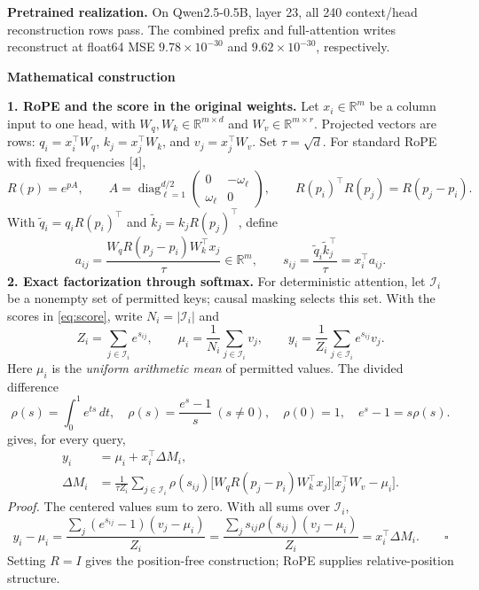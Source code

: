 \documentclass[10pt,a4paper]{article}
\newcommand{\R}{\mathbb R}
\newcommand{\T}{^{\!\top}}
\newcommand{\calI}{\mathcal I}
\newcommand{\ddM}{\Delta M}
\begin{document}
\textbf{Pretrained realization.}
On Qwen2.5-0.5B, layer 23, all 240 context/head reconstruction rows pass.
The combined prefix and full-attention writes reconstruct at float64 MSE
$9.78\times10^{-30}$ and $9.62\times10^{-30}$, respectively.

\medskip

\fontsize{10}{15.8}\selectfont
\setlength{\parskip}{10pt}
\textbf{Mathematical construction}

\textbf{1. RoPE and the score in the original weights.}
Let $x_i\in\R^m$ be a column input to one head, with
$W_q,W_k\in\R^{m\times d}$ and $W_v\in\R^{m\times r}$.
Projected vectors are rows: $q_i=x_i\T W_q$, $k_j=x_j\T W_k$,
and $v_j=x_j\T W_v$. Set $\tau=\sqrt d$.
For standard RoPE with fixed frequencies [4],
\begin{equation}
R(p)=e^{pA},\qquad
A=\operatorname{diag}_{\ell=1}^{d/2}
\begin{pmatrix}0&-\omega_\ell\\\omega_\ell&0\end{pmatrix},
\qquad R(p_i)\T R(p_j)=R(p_j-p_i).
\label{eq:rope}
\end{equation}
With
$\widetilde q_i=q_iR(p_i)\T$ and $\widetilde k_j=k_jR(p_j)\T$, define
\begin{equation}
a_{ij}=\frac{W_qR(p_j-p_i)W_k\T x_j}{\tau}\in\R^m,
\qquad
s_{ij}=\frac{\widetilde q_i\widetilde k_j\T}{\tau}=x_i\T a_{ij}.
\label{eq:score}
\end{equation}
\textbf{2. Exact factorization through softmax.}
For deterministic attention, let $\calI_i$ be a nonempty set of permitted keys;
causal masking selects this set. With the scores in \eqref{eq:score}, write
$N_i=|\calI_i|$ and
\begin{equation}
Z_i=\sum_{j\in\calI_i}e^{s_{ij}},\qquad
\mu_i=\frac1{N_i}\sum_{j\in\calI_i}v_j,\qquad
y_i=\frac1{Z_i}\sum_{j\in\calI_i}e^{s_{ij}}v_j.
\label{eq:softmax}
\end{equation}
Here $\mu_i$ is the \emph{uniform arithmetic mean} of permitted values. The divided difference
\begin{equation}
\rho(s)=\int_0^1 e^{ts}\,dt,\quad
\rho(s)=\frac{e^s-1}{s}\ (s\ne0),\quad
\rho(0)=1,\quad e^s-1=s\rho(s).
\label{eq:rho}
\end{equation}
gives, for every query,
\begin{equation}
\boxed{\begin{aligned}
 y_i&=\mu_i+x_i\T\ddM_i,\\
 \ddM_i&=\frac1{\tau Z_i}\sum_{j\in\calI_i}
 \rho(s_{ij})\big[W_qR(p_j-p_i)W_k\T x_j\big]
 \big[x_j\T W_v-\mu_i\big].
\end{aligned}}
\label{eq:main}
\end{equation}
\emph{Proof.} The centered values sum to zero. With all sums over $\calI_i$,
\begin{equation*}
y_i-\mu_i
=\frac{\sum_j(e^{s_{ij}}-1)(v_j-\mu_i)}{Z_i}
=\frac{\sum_j s_{ij}\rho(s_{ij})(v_j-\mu_i)}{Z_i}
=x_i\T\ddM_i.\qquad\square
\end{equation*}
Setting $R=I$ gives the position-free construction; RoPE supplies relative-position structure.
\end{document}
